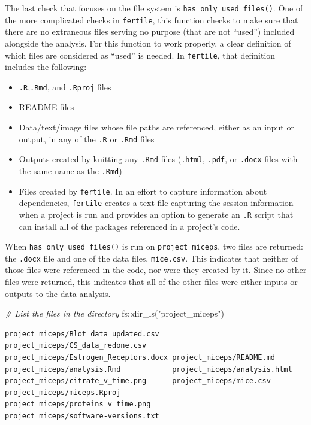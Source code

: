 \documentclass[12pt,twoside]{reedthesis}
\newenvironment{Shaded}{\begin{snugshade}}{\end{snugshade}}
\newcommand{\CommentTok}[1]{\textcolor[rgb]{0.56,0.35,0.01}{\textit{#1}}}
\newcommand{\FunctionTok}[1]{\textcolor[rgb]{0.00,0.00,0.00}{#1}}
\newcommand{\NormalTok}[1]{#1}
\newcommand{\SpecialCharTok}[1]{\textcolor[rgb]{0.00,0.00,0.00}{#1}}
\newcommand{\StringTok}[1]{\textcolor[rgb]{0.31,0.60,0.02}{#1}}
\providecommand{\tightlist}{%
  \setlength{\itemsep}{0pt}\setlength{\parskip}{0pt}}
\begin{document}
The last check that focuses on the file system is \texttt{has\_only\_used\_files()}. One of the more complicated checks in \texttt{fertile}, this function checks to make sure that there are no extraneous files serving no purpose (that are not ``used'') included alongside the analysis. For this function to work properly, a clear definition of which files are considered as ``used'' is needed. In \texttt{fertile}, that definition includes the following:
\begin{itemize}
\tightlist
\item
  \texttt{.R},\texttt{.Rmd}, and \texttt{.Rproj} files
\item
  README files
\item
  Data/text/image files whose file paths are referenced, either as an input or output, in any of the \texttt{.R} or \texttt{.Rmd} files
\item
  Outputs created by knitting any \texttt{.Rmd} files (\texttt{.html}, \texttt{.pdf}, or \texttt{.docx} files with the same name as the \texttt{.Rmd})
\item
  Files created by \texttt{fertile}. In an effort to capture information about dependencies, \texttt{fertile} creates a text file capturing the session information when a project is run and provides an option to generate an \texttt{.R} script that can install all of the packages referenced in a project's code.
\end{itemize}
When \texttt{has\_only\_used\_files()} is run on \texttt{project\_miceps}, two files are returned: the \texttt{.docx} file and one of the data files, \texttt{mice.csv}. This indicates that neither of those files were referenced in the code, nor were they created by it. Since no other files were returned, this indicates that all of the other files were either inputs or outputs to the data analysis.
\begin{Shaded}
\begin{Highlighting}[]
\CommentTok{\# List the files in the directory}
\NormalTok{fs}\SpecialCharTok{::}\FunctionTok{dir\_ls}\NormalTok{(}\StringTok{"project\_miceps"}\NormalTok{)}
\end{Highlighting}
\end{Shaded}
\begin{verbatim}
project_miceps/Blot_data_updated.csv   project_miceps/CS_data_redone.csv      
project_miceps/Estrogen_Receptors.docx project_miceps/README.md               
project_miceps/analysis.Rmd            project_miceps/analysis.html           
project_miceps/citrate_v_time.png      project_miceps/mice.csv                
project_miceps/miceps.Rproj            project_miceps/proteins_v_time.png     
project_miceps/software-versions.txt   
\end{verbatim}
\end{document}
